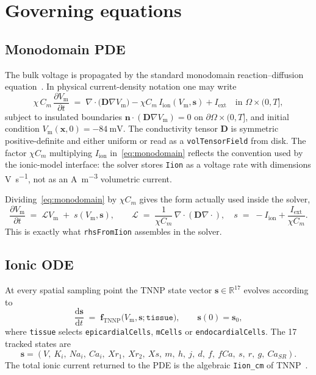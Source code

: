\documentclass[11pt,a4paper]{article}
\newcommand{\code}[1]{\texttt{\small #1}}
\newcommand{\Vm}{V_{\text{m}}}
\newcommand{\Iion}{I_{\mathrm{ion}}}
\newcommand{\Dten}{\mathbf{D}}
\newcommand{\grad}{\nabla}
\newcommand{\divg}{\nabla\!\cdot}
\newcommand{\R}{\mathbb{R}}
\newcommand{\Iext}{I_{\mathrm{ext}}}
\begin{document}
\section{Governing equations}

\subsection{Monodomain PDE}

The bulk voltage is propagated by the standard monodomain
reaction--diffusion equation~\cite{ttp2004,niederer2012}. In physical
current-density notation one may write
\begin{equation}
  \chi \, C_{m} \, \frac{\partial \Vm}{\partial t}
   \;=\;
   \divg\!\bigl( \Dten \grad \Vm \bigr)
   - \chi C_m\,\Iion(\Vm, \mathbf{s})
   + \Iext
   \quad \text{in } \Omega \times (0, T],
   \label{eq:monodomain}
\end{equation}
subject to insulated boundaries
$\mathbf{n} \cdot ( \Dten \grad \Vm ) = 0$ on
$\partial \Omega \times (0, T]$, and initial condition
$\Vm(\mathbf{x}, 0) = -\SI{84}{\milli\volt}$. The conductivity tensor
$\Dten$ is symmetric positive-definite and either uniform or read as a
\code{volTensorField} from disk. The factor $\chi C_m$ multiplying
$\Iion$ in~\eqref{eq:monodomain} reflects the convention used by the
ionic-model interface: the solver stores \code{Iion} as a voltage rate
with dimensions \si{\volt\per\second}, not as an
\si{\ampere\per\meter\cubed} volumetric current.

Dividing~\eqref{eq:monodomain} by $\chi C_{m}$ gives the form actually
used inside the solver,
\begin{equation}
  \frac{\partial \Vm}{\partial t}
   \;=\;
   \mathcal{L} \Vm
   \;+\;
   s(\Vm, \mathbf{s}),
   \qquad
   \mathcal{L} \;=\; \frac{1}{\chi C_{m}}\,\divg(\Dten \grad \cdot),
   \quad
   s \;=\; -\Iion + \frac{\Iext}{\chi C_{m}}.
   \label{eq:semi-discrete}
\end{equation}
This is exactly what \code{rhsFromIion} assembles in the solver.

\subsection{Ionic ODE}

At every spatial sampling point the TNNP state vector
$\mathbf{s} \in \R^{17}$ evolves according to
\begin{equation}
  \frac{\mathrm{d}\mathbf{s}}{\mathrm{d}t}
   \;=\;
   \mathbf{f}_{\text{TNNP}}\!\bigl(\Vm, \mathbf{s}; \texttt{tissue}\bigr),
   \qquad \mathbf{s}(0) = \mathbf{s}_{0},
   \label{eq:tnnp}
\end{equation}
where \code{tissue} selects \code{epicardialCells}, \code{mCells} or
\code{endocardialCells}. The 17 tracked states are
\[
  \mathbf{s} = (V,\ K_{i},\ Na_{i},\ Ca_{i},\ Xr_{1},\ Xr_{2},\ Xs,\ m,\ h,\ j,\ d,\ f,\ fCa,\ s,\ r,\ g,\ Ca_{SR}).
\]
The total ionic current returned to the PDE is the algebraic
\code{Iion\_cm} of TNNP~\cite{ttp2004}.
\end{document}
